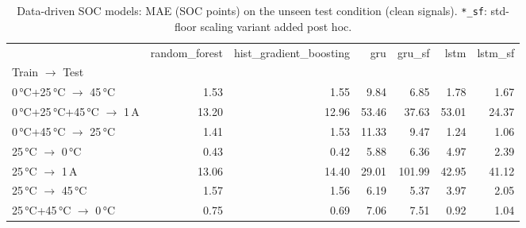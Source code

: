 \begin{table}[htbp]\centering\footnotesize
\begin{tabular}{lrrrrrr}
\toprule
 & random\_forest & hist\_gradient\_boosting & gru & gru\_sf & lstm & lstm\_sf \\
Train $\rightarrow$ Test &  &  &  &  &  &  \\
\midrule
0\,°C+25\,°C $\rightarrow$ 45\,°C & 1.53 & 1.55 & 9.84 & 6.85 & 1.78 & 1.67 \\
0\,°C+25\,°C+45\,°C $\rightarrow$ 1\,A & 13.20 & 12.96 & 53.46 & 37.63 & 53.01 & 24.37 \\
0\,°C+45\,°C $\rightarrow$ 25\,°C & 1.41 & 1.53 & 11.33 & 9.47 & 1.24 & 1.06 \\
25\,°C $\rightarrow$ 0\,°C & 0.43 & 0.42 & 5.88 & 6.36 & 4.97 & 2.39 \\
25\,°C $\rightarrow$ 1\,A & 13.06 & 14.40 & 29.01 & 101.99 & 42.95 & 41.12 \\
25\,°C $\rightarrow$ 45\,°C & 1.57 & 1.56 & 6.19 & 5.37 & 3.97 & 2.05 \\
25\,°C+45\,°C $\rightarrow$ 0\,°C & 0.75 & 0.69 & 7.06 & 7.51 & 0.92 & 1.04 \\
\bottomrule
\end{tabular}
\caption{Data-driven SOC models: MAE (SOC points) on the unseen test condition (clean signals). \texttt{*\_sf}: std-floor scaling variant added post hoc.}\label{tab:socdd}
\end{table}
